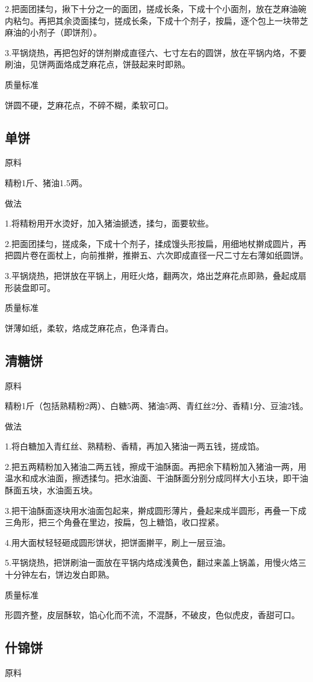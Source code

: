 \documentclass{ctexbook}
\begin{document}
2.把面团揉匀，揪下十分之一的面团，搓成长条，下成十个小面剂，放在芝麻油碗内粘匀。再把其余烫面揉匀，搓成长条，下成十个剂子，按扁，逐个包上一块带芝麻油的小剂子（即饼剂）。

3.平锅烧热，再把包好的饼剂擀成直径六、七寸左右的圆饼，放在平锅内烙，不要刷油，见饼两面烙成芝麻花点，饼鼓起来时即熟。

质量标准

饼圆不硬，芝麻花点，不碎不糊，柔软可口。
\subsection{单饼}
原料

精粉1斤、猪油1.5两。

做法

1.将精粉用开水烫好，加入猪油搋透，揉匀，面要软些。

2.把面团揉匀，搓成条，下成十个剂子，揉成馒头形按扁，用细地杖擀成圆片，再把圆片卷在面杖上，向前推擀，推擀五、六次即成直径一尺二寸左右薄如纸圆饼。

3.平锅烧热，把饼放在平锅上，用旺火烙，翻两次，烙出芝麻花点即熟，叠起成扇形装盘即可。

质量标准

饼薄如纸，柔软，烙成芝麻花点，色泽青白。
\subsection{清糖饼}
原料

精粉1斤（包括熟精粉2两）、白糖5两、猪油5两、青红丝2分、香精1分、豆油2钱。

做法

1.将白糖加入青红丝、熟精粉、香精，再加入猪油一两五钱，搓成馅。

2.把五两精粉加入猪油二两五钱，擦成干油酥面。再把余下精粉加入猪油一两，用温水和成水油面，擦透揉匀。把水油面、干油酥面分别分成同样大小五块，即干油酥面五块，水油面五块。

3.把干油酥面逐块用水油面包起来，擀成圆形薄片，叠起来成半圆形，再叠一下成三角形，把三个角叠在里边，按扁，包上糖馅，收口捏紧。

4.用大面杖轻轻砸成圆形饼状，把饼面擀平，刷上一层豆油。

5.平锅烧热，把饼刷油一面放在平锅内烙成浅黄色，翻过来盖上锅盖，用慢火烙三十分钟左右，饼边发白即熟。

质量标准

形圆齐整，皮层酥软，馅心化而不流，不混酥，不破皮，色似虎皮，香甜可口。
\subsection{什锦饼}
原料
\end{document}
